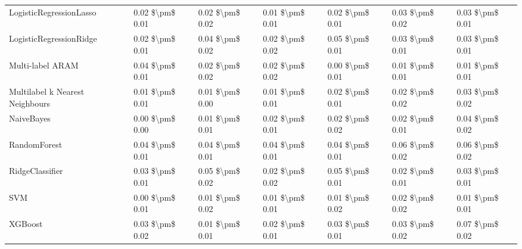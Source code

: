 \begin{tabular}{lllllll}
        LogisticRegressionLasso & 0.02 \$\textbackslash pm\$ 0.01 &           0.02 \$\textbackslash pm\$ 0.02 &       0.01 \$\textbackslash pm\$ 0.01 &        0.02 \$\textbackslash pm\$ 0.01 &                         0.03 \$\textbackslash pm\$ 0.02 &     0.03 \$\textbackslash pm\$ 0.01 \\
        LogisticRegressionRidge & 0.02 \$\textbackslash pm\$ 0.01 &           0.04 \$\textbackslash pm\$ 0.02 &       0.02 \$\textbackslash pm\$ 0.02 &        0.05 \$\textbackslash pm\$ 0.01 &                         0.03 \$\textbackslash pm\$ 0.01 &     0.03 \$\textbackslash pm\$ 0.01 \\
               Multi-label ARAM & 0.04 \$\textbackslash pm\$ 0.01 &           0.02 \$\textbackslash pm\$ 0.02 &       0.02 \$\textbackslash pm\$ 0.02 &        0.00 \$\textbackslash pm\$ 0.01 &                         0.01 \$\textbackslash pm\$ 0.01 &     0.01 \$\textbackslash pm\$ 0.01 \\
Multilabel k Nearest Neighbours & 0.01 \$\textbackslash pm\$ 0.01 &           0.01 \$\textbackslash pm\$ 0.00 &       0.01 \$\textbackslash pm\$ 0.01 &        0.02 \$\textbackslash pm\$ 0.01 &                         0.02 \$\textbackslash pm\$ 0.02 &     0.03 \$\textbackslash pm\$ 0.02 \\
                     NaiveBayes & 0.00 \$\textbackslash pm\$ 0.00 &           0.01 \$\textbackslash pm\$ 0.01 &       0.02 \$\textbackslash pm\$ 0.01 &        0.02 \$\textbackslash pm\$ 0.02 &                         0.02 \$\textbackslash pm\$ 0.01 &     0.04 \$\textbackslash pm\$ 0.02 \\
                   RandomForest & 0.04 \$\textbackslash pm\$ 0.01 &           0.04 \$\textbackslash pm\$ 0.01 &       0.04 \$\textbackslash pm\$ 0.01 &        0.04 \$\textbackslash pm\$ 0.01 &                         0.06 \$\textbackslash pm\$ 0.02 &     0.06 \$\textbackslash pm\$ 0.02 \\
                RidgeClassifier & 0.03 \$\textbackslash pm\$ 0.01 &           0.05 \$\textbackslash pm\$ 0.02 &       0.02 \$\textbackslash pm\$ 0.02 &        0.05 \$\textbackslash pm\$ 0.01 &                         0.02 \$\textbackslash pm\$ 0.01 &     0.03 \$\textbackslash pm\$ 0.01 \\
                            SVM & 0.00 \$\textbackslash pm\$ 0.01 &           0.01 \$\textbackslash pm\$ 0.02 &       0.01 \$\textbackslash pm\$ 0.01 &        0.01 \$\textbackslash pm\$ 0.02 &                         0.02 \$\textbackslash pm\$ 0.02 &     0.01 \$\textbackslash pm\$ 0.01 \\
                        XGBoost & 0.03 \$\textbackslash pm\$ 0.02 &           0.01 \$\textbackslash pm\$ 0.01 &       0.02 \$\textbackslash pm\$ 0.01 &        0.03 \$\textbackslash pm\$ 0.01 &                         0.03 \$\textbackslash pm\$ 0.02 &     0.07 \$\textbackslash pm\$ 0.02 \\
\bottomrule
\end{tabular}
